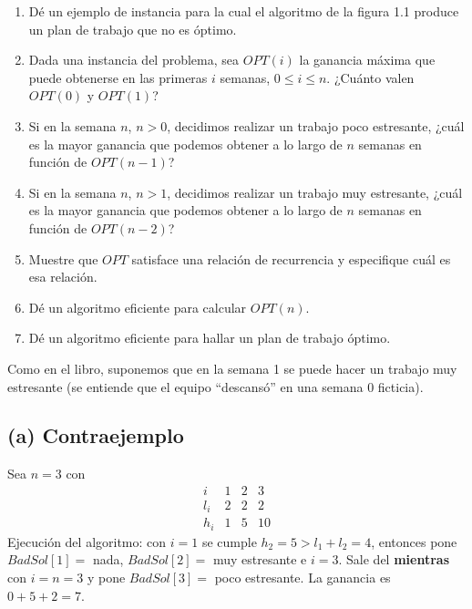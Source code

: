 \begin{enunciado}
\begin{enumerate}[label=(\alph*)]
\item Dé un ejemplo de instancia para la cual el algoritmo de la figura 1.1 produce un plan de trabajo que no es óptimo.
\item Dada una instancia del problema, sea $OPT(i)$ la ganancia máxima que puede obtenerse en las primeras $i$ semanas, $0\le i\le n$. ¿Cuánto valen $OPT(0)$ y $OPT(1)$?
\item Si en la semana $n$, $n>0$, decidimos realizar un trabajo poco estresante, ¿cuál es la mayor ganancia que podemos obtener a lo largo de $n$ semanas en función de $OPT(n-1)$?
\item Si en la semana $n$, $n>1$, decidimos realizar un trabajo muy estresante, ¿cuál es la mayor ganancia que podemos obtener a lo largo de $n$ semanas en función de $OPT(n-2)$?
\item Muestre que $OPT$ satisface una relación de recurrencia y especifique cuál es esa relación.
\item Dé un algoritmo eficiente para calcular $OPT(n)$.
\item Dé un algoritmo eficiente para hallar un plan de trabajo óptimo.
\end{enumerate}
\end{enunciado}


Como en el libro, suponemos que en la semana 1 se puede hacer un trabajo muy estresante (se entiende que el equipo ``descansó'' en una semana $0$ ficticia).

\subsection*{(a) Contraejemplo}

Sea $n=3$ con
\[
\begin{array}{c|ccc}
 i & 1 & 2 & 3\\\hline
 l_i & 2 & 2 & 2\\
 h_i & 1 & 5 & 10
\end{array}
\]
Ejecución del algoritmo: con $i=1$ se cumple $h_2=5>l_1+l_2=4$, entonces pone $BadSol[1]=$ nada, $BadSol[2]=$ muy estresante e $i=3$. Sale del \textbf{mientras} con $i=n=3$ y pone $BadSol[3]=$ poco estresante. La ganancia es $0+5+2=7$.

